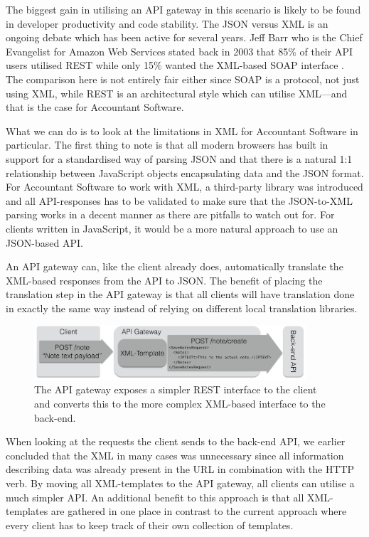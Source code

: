 \documentclass{cslthse-msc}
\begin{document}
The biggest gain in utilising an API gateway in this scenario is likely to be found in developer productivity and code stability. The JSON versus XML is an ongoing debate which has been active for several years. Jeff Barr who is the Chief Evangelist for Amazon Web Services stated back in 2003 that 85\% of their API users utilised REST while only 15\% wanted the XML-based SOAP interface \cite{soap_amazon}. The comparison here is not entirely fair either since SOAP is a protocol, not just using XML, while REST is an architectural style which can utilise XML---and that is the case for Accountant Software.

What we can do is to look at the limitations in XML for Accountant Software in particular. The first thing to note is that all modern browsers has built in support for a standardised way of parsing JSON and that there is a natural 1:1 relationship between JavaScript objects encapsulating data and the JSON format. For Accountant Software to work with XML, a third-party library was introduced and all API-responses has to be validated to make sure that the JSON-to-XML parsing works in a decent manner as there are pitfalls to watch out for. For clients written in JavaScript, it would be a more natural approach to use an JSON-based API.

An API gateway can, like the client already does, automatically translate the XML-based responses from the API to JSON. The benefit of placing the translation step in the API gateway is that all clients will have translation done in exactly the same way instead of relying on different local translation libraries.

\begin{figure}[H]
  \centering
    \begin{center}
      \includegraphics[width=0.9\textwidth]{images/api_gateway_xml.png}
    \end{center}
  \caption{The API gateway exposes a simpler REST interface to the client and converts this to the more complex XML-based interface to the back-end.}
\end{figure}

When looking at the requests the client sends to the back-end API, we earlier concluded that the XML in many cases was unnecessary since all information describing data was already present in the URL in combination with the HTTP verb. By moving all XML-templates to the API gateway, all clients can utilise a much simpler API. An additional benefit to this approach is that all XML-templates are gathered in one place in contrast to the current approach where every client has to keep track of their own collection of templates.
\end{document}

